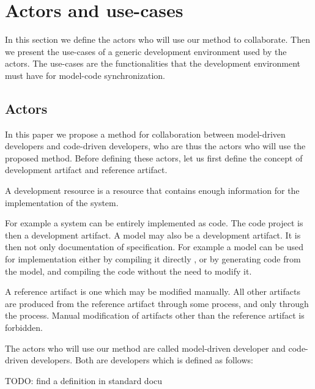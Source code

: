 \section{Actors and use-cases}
\label{sec:use-case}

In this section we define the actors who will use our method to collaborate.
Then we present the use-cases of a generic development environment used by
the actors. The use-cases are the functionalities that the development environment
must have for model-code synchronization.

\subsection{Actors}

In this paper we propose a method for collaboration between model-driven developers
and code-driven developers, who are thus the actors who will use the proposed method.
Before defining these actors, let us first define the concept of development artifact and reference artifact.

\begin{definition}
A development resource is a resource that contains enough information
for the implementation of the system.
\end{definition}

For example a system can be entirely implemented as code.
The code project is then a development artifact.
A model may also be a development artifact.
It is then not only documentation of specification.
For example a model can be used for implementation either by compiling
it directly \cite{asma}, or by generating code from the model, and compiling the code without
the need to modify it.

\begin{definition}
A reference artifact is one which may be modified manually.
All other artifacts are produced from the reference artifact
through some process, and only through the process. Manual modification
of artifacts other than the reference artifact is forbidden.
\end{definition}

The actors who will use our method are called 
model-driven developer and code-driven developers.
Both are developers which is defined as follows:

\begin{definition}
TODO: find a definition in standard docu
\end{definition}

